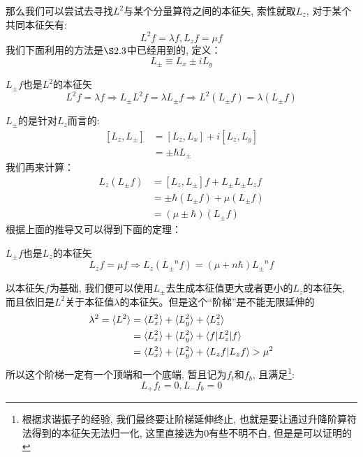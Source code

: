 \documentclass[a4paper,zihao=-4,linespread=1]{ctexrep}
\begin{document}
    那么我们可以尝试去寻找$L^2$与某个分量算符之间的本征矢, 索性就取$L_z$, 对于某个共同本征矢有:
    \[L^2f=\lambda f,L_zf=\mu f\]
    我们下面利用的方法是$\S 2.3$中已经用到的, 定义：
    \[L_\pm \equiv L_x\pm iL_y\]
    \begin{theorem}{$L_\pm f$也是$L^2$的本征矢}
        \begin{equation}
            \label{eq:4.50}
            L^2f=\lambda f\Rightarrow L_\pm L^2f=\lambda L_\pm f\Rightarrow L^2\left(L_\pm f\right)=\lambda\left(L_\pm f\right)
        \end{equation}
    \end{theorem}
    $L_\pm$的是针对$L_z$而言的:
    \begin{align*}
        \left[L_z,L_\pm\right]&=\left[L_z,L_x\right]+i\left[L_z,L_y\right]\\
        &=\pm \hbar L_\pm
    \end{align*}
    我们再来计算：
    \begin{align*}
        L_z\left(L_\pm f\right)&=\left[L_z,L_\pm\right]f+L_\pm L_\pm L_z f\\
        &=\pm\hbar \left(L_\pm f\right)+\mu \left(L_\pm f\right)\\
        &=\left(\mu\pm\hbar\right)\left(L_\pm f\right)
    \end{align*}
    根据上面的推导又可以得到下面的定理：
    \begin{theorem}{$L_\pm f$也是$L_z$的本征矢}
        \begin{equation}
            L_zf=\mu f\Rightarrow L_z\left({L_\pm}^nf\right)=\left(\mu + n\hbar\right){L_\pm}^nf
        \end{equation}
    \end{theorem}  
    以本征矢$f$为基础, 我们便可以使用$L_\pm$去生成本征值更大或者更小的$L_z$的本征矢, 而且依旧是$L^2$关于本征值$\lambda$的本征矢。但是这个“阶梯”是不能无限延伸的
    \begin{align*}
        \lambda^2=\braket{L^2}&=\braket{L_x^2}+\braket{L_y^2}+\braket{L_z^2}\\ &=\braket{L_x^2}+\braket{L_y^2}+\braket{f|L_z^2|f}\\
                    &=\braket{L_x^2}+\braket{L_y^2}+\braket{L_zf|L_zf}>\mu^2
    \end{align*}
    所以这个阶梯一定有一个顶端和一个底端, 暂且记为$f_t$和$f_b$, 且满足\footnote{根据求谐振子的经验, 我们最终要让阶梯延伸终止, 也就是要让通过升降阶算符法得到的本征矢无法归一化, 这里直接选为$0$有些不明不白, 但是是可以证明的}:
    \[L_+f_t=0,L_-f_b=0\]
\end{document}
